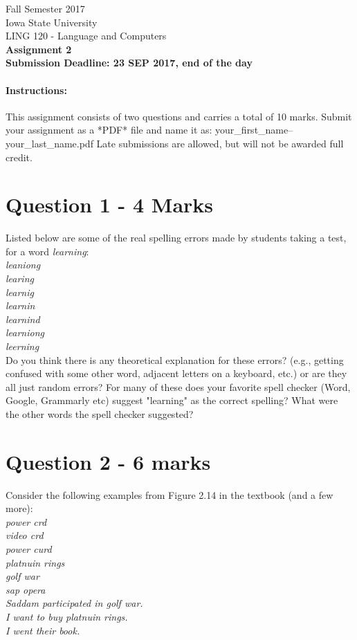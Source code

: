 \documentclass[11pt,a4paper]{article}
\begin{document}
\begin{center}
  Fall Semester 2017 \\ Iowa State University\\[3ex]
  \large LING 120 - Language and Computers\\[3ex]
  \textbf{Assignment 2} \\ \textbf{Submission Deadline: 23 SEP 2017, end of the day}
\end{center}

\paragraph{Instructions:} This assignment consists of two questions and carries a total of 10 marks. Submit your assignment as a *PDF* file and name it as: your\_first\_name--your\_last\_name.pdf Late submissions are allowed, but will not be awarded full credit.

\section*{Question 1 - 4 Marks} 
Listed below are some of the real spelling errors made by students taking a test, for a word \textit{learning}:\\
\textit{leaniong \\
learing \\
learnig \\
learnin \\
learnind \\
learniong \\
leerning \\}
Do you think there is any theoretical explanation for these errors? (e.g., getting confused with some other word, adjacent letters on a keyboard, etc.) or are they all just random errors? For many of these does your favorite spell checker (Word, Google, Grammarly etc) suggest "learning" as the correct spelling? What were the other words the spell checker suggested? 


\section*{Question 2 - 6 marks}
Consider the following examples from Figure 2.14 in the textbook (and a few more):\\
\textit{power crd \\
video crd \\
power curd \\
platnuin rings \\
golf war \\
sap opera \\
Saddam participated in golf war. \\
I want to buy platnuin rings. \\
I went their book.\\}
\end{document}
